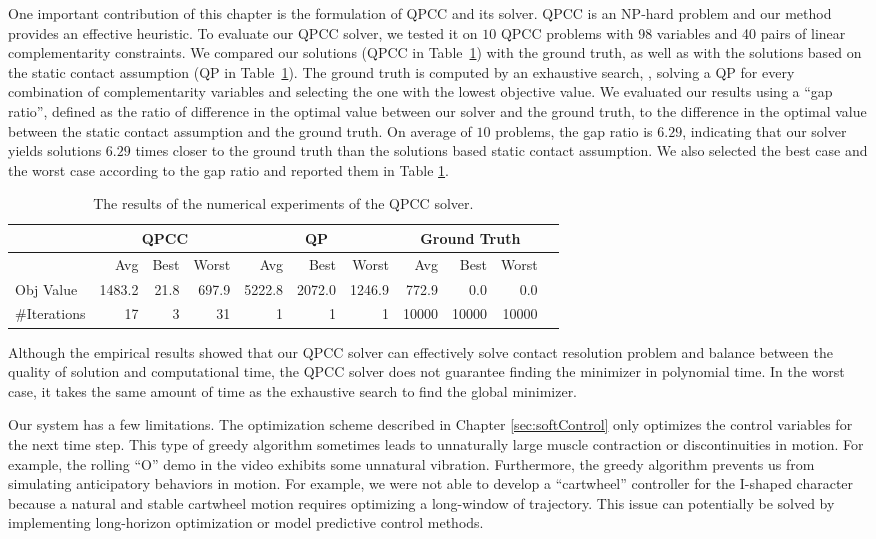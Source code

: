 One important contribution of this chapter is the formulation of QPCC and its solver.
QPCC is an NP-hard problem \cite{Braun:2005} and our method provides an effective heuristic.
To evaluate our QPCC solver, we tested it on $10$
QPCC problems with 98 variables and 40 pairs of linear complementarity
constraints. We compared our solutions (QPCC in Table~\ref{tab:qpcc}) with the ground truth, as well
as with the solutions based on the static contact assumption (QP in Table~\ref{tab:qpcc}). The
ground truth is computed by an exhaustive search, \ie, solving a QP
for every combination of complementarity variables and selecting the one
with the lowest objective value. We evaluated our results using a ``gap
ratio'', defined as the ratio of difference in the optimal value between
our solver and the ground truth, to the difference in the optimal value
between the static contact assumption and the ground truth. On average
of $10$ problems, the gap ratio is $6.29$, indicating that our solver
yields solutions $6.29$ times closer to the ground truth than the
solutions based static contact assumption. We also selected the best
case and the worst case according to the gap ratio and reported them
in Table \ref{tab:qpcc}.
\begin{table}
  \centering
   \caption{The results of the numerical experiments of the QPCC solver. }
\begin{tabular}{|l|r|r|r|r|r|r|r|r|r|r|}
\hline
&\multicolumn{3}{|c|}{QPCC} & \multicolumn{3}{|c|}{QP}  & \multicolumn{3}{|c|}{Ground Truth} \\ \hline
& Avg & Best & Worst & Avg & Best & Worst & Avg & Best & Worst \\ \hline
Obj Value & 1483.2 & 21.8 & 697.9 & 5222.8 & 2072.0& 1246.9 & 772.9 & 0.0 & 0.0 \\ \hline
\#Iterations & 17 & 3 & 31 & 1 & 1 & 1 & 10000 & 10000 & 10000 \\
\hline
\end{tabular}
 \label{tab:qpcc}
\end{table}
Although the empirical results showed that our QPCC solver can
effectively solve contact resolution problem and balance between the
quality of solution and computational time, the QPCC solver does not
guarantee finding the minimizer in polynomial time. In the
worst case, it takes the same amount of time as the exhaustive search
to find the global minimizer.

Our system has a few limitations.  The
optimization scheme described in Chapter \ref{sec:softControl} only
optimizes the control variables for the next time step. This type of
greedy algorithm sometimes leads to unnaturally large muscle contraction or
discontinuities in motion. For example, the rolling ``O'' demo in the
video exhibits some unnatural vibration. Furthermore, the greedy algorithm prevents us
from simulating anticipatory behaviors in motion. For example, we were
not able to develop a ``cartwheel'' controller for the I-shaped
character because a natural and stable cartwheel motion requires
optimizing a long-window of trajectory. This issue can potentially be
solved by implementing long-horizon optimization or model predictive
control methods.

